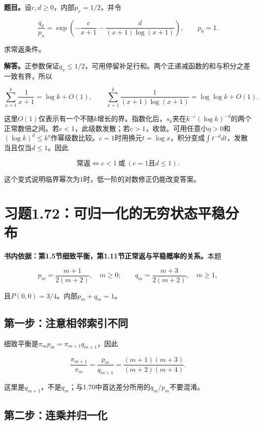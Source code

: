 \documentclass[
  11pt,a4paper,UTF8,fontset=fandol]{ctexart}
\begin{document}
\textbf{题目。}设\(c,d\ge0\)，内部\(p_x=1/2\)，并令

\[\frac{q_x}{p_x}=\exp\left(-\frac{c}{x+1}-\frac{d}{(x+1)\log(x+1)}\right),\qquad p_0=1.\]

求常返条件。

\textbf{解答。}正参数保证\(q_x\le1/2\)，可用停留补足行和。两个正递减函数的和与积分之差一致有界，所以

\[\sum_{x=1}^k\frac1{x+1}=\log k+O(1),\qquad
\sum_{x=1}^k\frac1{(x+1)\log(x+1)}=\log\log k+O(1).\]

这里\(O(1)\)仅表示有一个不随\(k\)增长的界。指数化后，\(s_k\)夹在\(k^{-c}(\log k)^{-d}\)的两个正常数倍之间。若\(c<1\)，此级数发散；若\(c>1\)，收敛。可用任意小\(\eta>0\)和\((\log k)^d\le k^\eta\)作幂级数比较。\(c=1\)时用换元\(t=\log x\)，积分变成\(\int t^{-d}dt\)，发散当且仅当\(d\le1\)。因此

\[\boxed{\text{常返}\iff c<1\ \text{或}\ (c=1\text{且}d\le1).}\]

这个变式说明临界幂次为1时，低一阶的对数修正仍能改变答案。

\section{习题1.72：可归一化的无穷状态平稳分布}\label{ux4e60ux98981.72ux53efux5f52ux4e00ux5316ux7684ux65e0ux7a77ux72b6ux6001ux5e73ux7a33ux5206ux5e03}

\textbf{书内依据：第1.5节细致平衡，第1.11节正常返与平稳概率的关系。}本题

\[p_m=\frac{m+1}{2(m+2)},\quad m\ge0;\qquad
q_m=\frac{m+3}{2(m+2)},\quad m\ge1,\]

且\(P(0,0)=3/4\)。内部\(p_m+q_m=1\)。

\subsection{第一步：注意相邻索引不同}\label{ux7b2cux4e00ux6b65ux6ce8ux610fux76f8ux90bbux7d22ux5f15ux4e0dux540c}

细致平衡是\(\pi_mp_m=\pi_{m+1}q_{m+1}\)，因此

\[\frac{\pi_{m+1}}{\pi_m}=\frac{p_m}{q_{m+1}}
=\frac{(m+1)(m+3)}{(m+2)(m+4)}.\]

这里是\(q_{m+1}\)，不是\(q_m\)；与1.70中首达差分所用的\(q_m/p_m\)不要混淆。

\subsection{第二步：连乘并归一化}\label{ux7b2cux4e8cux6b65ux8fdeux4e58ux5e76ux5f52ux4e00ux5316}
\end{document}
